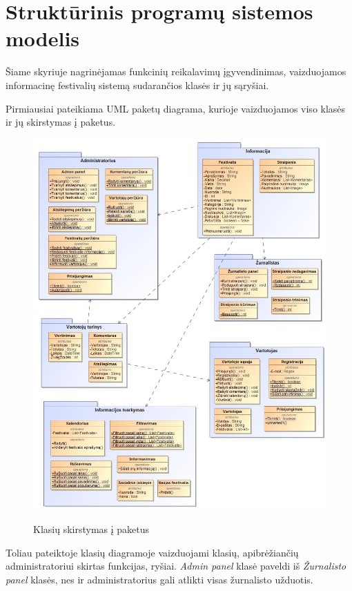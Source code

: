 ﻿\documentclass{VUMIFPSkursinis}
\begin{document}
\section{Struktūrinis programų sistemos modelis}
Šiame skyriuje nagrinėjamas funkcinių reikalavimų įgyvendinimas, vaizduojamos informacinę festivalių sistemą sudarančios klasės ir jų sąryšiai.

Pirmiausiai pateikiama UML paketų diagrama, kurioje vaizduojamos viso klasės ir jų skirstymas į paketus.
\begin{figure}[H]
\centering
    \includegraphics[scale=0.5]{img/PSI3/paketai}
	\label{img:uml17}
	\caption{Klasių skirstymas į paketus}
\end{figure}
\newpage
Toliau pateiktoje klasių diagramoje vaizduojami klasių, apibrėžiančių administratoriui skirtas funkcijas, ryšiai. \textit{Admin panel} klasė paveldi iš \textit{Žurnalisto panel} klasės, nes ir administratorius gali atlikti visas žurnalisto užduotis.
\end{document}
